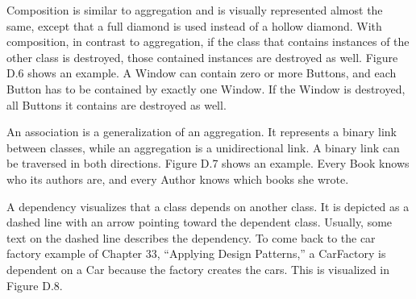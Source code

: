 
Composition is similar to aggregation and is visually represented almost the same, except that a full diamond is used instead of a hollow diamond. With composition, in contrast to aggregation, if the class that contains instances of the other class is destroyed, those contained instances are destroyed as well. Figure D.6 shows an example. A Window can contain zero or more Buttons, and each Button has to be contained by exactly one Window. If the Window is destroyed, all Buttons it contains are destroyed as well.



An association is a generalization of an aggregation. It represents a binary link between classes, while an aggregation is a unidirectional link. A binary link can be traversed in both directions. Figure D.7 shows an example. Every Book knows who its authors are, and every Author knows which books she wrote.



A dependency visualizes that a class depends on another class. It is depicted as a dashed line with an arrow pointing toward the dependent class. Usually, some text on the dashed line describes the dependency. To come back to the car factory example of Chapter 33, “Applying Design Patterns,” a CarFactory is dependent on a Car because the factory creates the cars. This is visualized in Figure D.8.


